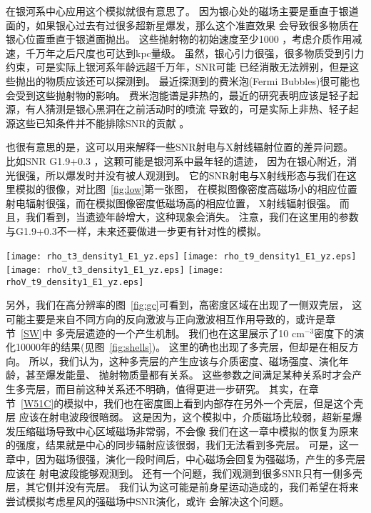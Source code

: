 在银河系中心应用这个模拟就很有意思了。
因为银心处的磁场主要是垂直于银道面的，如果银心过去有过很多超新星爆发，那么这个准直效果
会导致很多物质在银心位置垂直于银道面抛出。
这些抛射物的初始速度至少1000 \kms ，考虑介质作用减速，千万年之后尺度也可达到kpc量级。
虽然，银心引力很强，很多物质受到引力约束，可是实际上银河系年龄远超千万年，SNR可能
已经消散无法辨别，但是这些抛出的物质应该还可以探测到。
最近探测到的费米泡(Fermi Bubbles)很可能也会受到这些抛射物的影响。
费米泡能谱是非热的，最近的研究表明应该是轻子起源，有人猜测是银心黑洞在之前活动时的喷流
导致的\citep{Yang2017}，可是实际上非热、轻子起源这些已知条件并不能排除SNR的贡献
\citep{Fujita2013}。

也很有意思的是，这可以用来解释一些SNR射电与X射线辐射位置的差异问题。
比如SNR G1.9+0.3 \citep{Reynolds2008,Borkowski2017}，这颗可能是银河系中最年轻的遗迹，
因为在银心附近，消光很强，所以爆发时并没有被人观测到。
它的SNR射电与X射线形态与我们在这里模拟的很像，对比图~\ref{fig:low}第一张图，
在模拟图像密度高磁场小的相应位置射电辐射很强，而在模拟图像密度低磁场高的相应位置，
X射线辐射很强。
而且，我们看到，当遗迹年龄增大，这种现象会消失。
注意，我们在这里用的参数与G1.9+0.3不一样，未来还要做进一步更有针对性的模拟。

\begin{figure*}
    \centering
    \texttt{[image: rho\_t3\_density1\_E1\_yz.eps]}
    \texttt{[image: rho\_t9\_density1\_E1\_yz.eps]}\newline
    \texttt{[image: rhoV\_t3\_density1\_E1\_yz.eps]}
    \texttt{[image: rhoV\_t9\_density1\_E1\_yz.eps]}
    \caption{强磁场下的低分辨率模拟的介质密度为0.5 cm$^{-3}$的模拟结果。
    上面两幅图是1500年和4500年后的密度、磁场分布，
    下面两幅图是1500年和4500年后的密度、速度分布。}
\label{fig:low}
\end{figure*}



另外，我们在高分辨率的图~\ref{fig:gc}可看到，高密度区域在出现了一侧双壳层，
这可能主要是来自不同方向的反向激波与正向激波相互作用导致的，或许是章节~\ref{SW}中
多壳层遗迹的一个产生机制。
我们也在这里展示了10 cm$^{-3}$密度下的演化10000年的结果(见图~\ref{fig:shells})。
这里的确也出现了多壳层，但却是在相反方向。
所以，我们认为，这种多壳层的产生应该与介质密度、磁场强度、演化年龄，甚至爆发能量、
抛射物质量都有关系。
这些参数之间满足某种关系时才会产生多壳层，而目前这种关系还不明确，值得更进一步研究。
其实，在章节~\ref{W51C}的模拟中，我们也在密度图上看到内部存在另外一个壳层，但是这个壳层
应该在射电波段很暗弱。
这是因为，这个模拟中，介质磁场比较弱，超新星爆发压缩磁场导致中心区域磁场非常弱，不会像
我们在这一章中模拟的恢复为原来的强度，结果就是中心的同步辐射应该很弱，我们无法看到多壳层。
可是，这一章中，因为磁场很强，演化一段时间后，中心磁场会回复为强磁场，产生的多壳层应该在
射电波段能够观测到。
还有一个问题，我们观测到很多SNR只有一侧多壳层，其它侧并没有壳层。
我们认为这可能是前身星运动造成的，我们希望在将来尝试模拟考虑星风的强磁场中SNR演化，或许
会解决这个问题。

